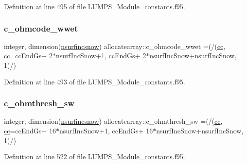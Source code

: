 Definition at line 495 of file L\+U\+M\+P\+S\+\_\+\+Module\+\_\+constants.\+f95.

\mbox{\label{namespaceallocatearray_a1333996a9ed29e913c8a79212a5aa7df}} 
\subsubsection{\texorpdfstring{c\+\_\+ohmcode\+\_\+wwet}{c\_ohmcode\_wwet}}
{\footnotesize\ttfamily integer, dimension(\hyperlink{namespaceallocatearray_af4d113f332b6759cfa22271140c9162d}{nsurfincsnow}) allocatearray\+::c\+\_\+ohmcode\+\_\+wwet =(/(\hyperlink{namespaceallocatearray_ac863c81704eb507dee10f5e10741e10c}{cc}, \hyperlink{namespaceallocatearray_ac863c81704eb507dee10f5e10741e10c}{cc}=cc\+End\+Gs+ 2$\ast$nsurf\+Inc\+Snow+1, cc\+End\+Gs+ 2$\ast$nsurf\+Inc\+Snow+nsurf\+Inc\+Snow, 1)/)}



Definition at line 493 of file L\+U\+M\+P\+S\+\_\+\+Module\+\_\+constants.\+f95.

\mbox{\label{namespaceallocatearray_a1797c2a2276d91be8028454587aeac96}} 
\subsubsection{\texorpdfstring{c\+\_\+ohmthresh\+\_\+sw}{c\_ohmthresh\_sw}}
{\footnotesize\ttfamily integer, dimension(\hyperlink{namespaceallocatearray_af4d113f332b6759cfa22271140c9162d}{nsurfincsnow}) allocatearray\+::c\+\_\+ohmthresh\+\_\+sw =(/(\hyperlink{namespaceallocatearray_ac863c81704eb507dee10f5e10741e10c}{cc}, \hyperlink{namespaceallocatearray_ac863c81704eb507dee10f5e10741e10c}{cc}=cc\+End\+Gs+ 16$\ast$nsurf\+Inc\+Snow+1, cc\+End\+Gs+ 16$\ast$nsurf\+Inc\+Snow+nsurf\+Inc\+Snow, 1)/)}



Definition at line 522 of file L\+U\+M\+P\+S\+\_\+\+Module\+\_\+constants.\+f95.

\mbox{\label{namespaceallocatearray_a535607f7b8841709da7652a90a12067a}} 
